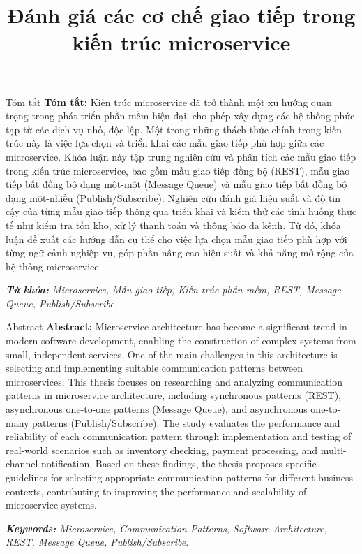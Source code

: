 \documentclass{uetgraduation}
\title{Đánh giá các cơ chế giao tiếp trong kiến trúc microservice}
\begin{document}
\makecovers

\begin{preamble}{Tóm tắt}
    \textbf{Tóm tắt:} Kiến trúc microservice đã trở thành  một xu hướng quan trọng trong phát triển phần mềm hiện đại, cho phép xây dựng các hệ thống phức tạp từ các dịch vụ nhỏ, độc lập. Một trong những thách thức chính trong kiến trúc này là việc lựa chọn và triển khai các mẫu giao tiếp phù hợp giữa các microservice. Khóa luận này tập trung nghiên cứu và phân tích các mẫu giao tiếp trong kiến trúc microservice, bao gồm mẫu giao tiếp đồng bộ (REST), mẫu giao tiếp bất đồng bộ dạng một-một (Message Queue) và mẫu giao tiếp bất đồng bộ dạng một-nhiều (Publish/Subscribe). Nghiên cứu đánh giá hiệu suất và độ tin cậy của từng mẫu giao tiếp thông qua triển khai và kiểm thử các tình huống thực tế như kiểm tra tồn kho, xử lý thanh toán và thông báo đa kênh. Từ đó, khóa luận đề xuất các hướng dẫn cụ thể cho việc lựa chọn mẫu giao tiếp phù hợp với từng ngữ cảnh nghiệp vụ, góp phần nâng cao hiệu suất và khả năng mở rộng của hệ thống microservice.

    \textit{\textbf{Từ khóa:} Microservice, Mẫu giao tiếp, Kiến trúc phần mềm, REST, Message Queue, Publish/Subscribe.}
\end{preamble}

\begin{preamble}{Abstract}
    \textbf{Abstract:} Microservice architecture has become a significant trend in modern software development, enabling the construction of complex systems from small, independent services. One of the main challenges in this architecture is selecting and implementing suitable communication patterns between microservices. This thesis focuses on researching and analyzing communication patterns in microservice architecture, including synchronous patterns (REST), asynchronous one-to-one patterns (Message Queue), and asynchronous one-to-many patterns (Publish/Subscribe). The study evaluates the performance and reliability of each communication pattern through implementation and testing of real-world scenarios such as inventory checking, payment processing, and multi-channel notification. Based on these findings, the thesis proposes specific guidelines for selecting appropriate communication patterns for different business contexts, contributing to improving the performance and scalability of microservice systems.

    \textit{\textbf{Keywords:} Microservice, Communication Patterns, Software Architecture, REST, Message Queue, Publish/Subscribe.}
\end{preamble}
\end{document}
